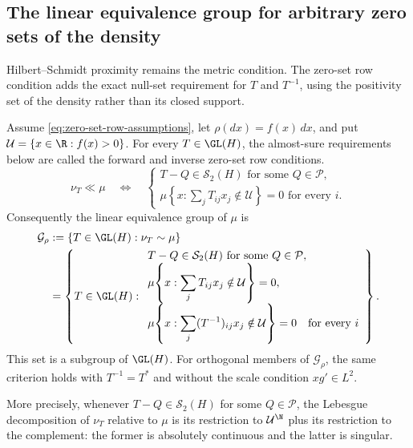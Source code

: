 \subsection{The linear equivalence group for arbitrary zero sets of the density}
\label{sec:linear-equivalence-group}

Hilbert--Schmidt proximity remains the metric condition.  The zero-set row
condition adds the exact null-set requirement for \(T\) and \(T^{-1}\), using
the positivity set of the density rather than its closed support.

\begin{theorem}
\label{thm:linear-equivalence-group}
Assume \eqref{eq:zero-set-row-assumptions}, let $\rho(dx)=f(x)\,dx$, and put
$\mathcal U=\{x\in\R:f(x)>0\}$.  For every $T\in\GL(H)$,
the almost-sure requirements below are called the forward and inverse
zero-set row conditions.
\begin{equation}
 \nu_T\ll\mu
 \quad\Longleftrightarrow\quad
 \begin{cases}
 T-Q\in\mathcal S_2(H)\text{ for some }Q\in\mathcal P,\\
 \displaystyle
 \mu\!\left\{x:\sum_jT_{ij}x_j\notin\mathcal U\right\}=0
       \text{ for every }i.
 \end{cases}
 \label{eq:absolute-continuity-operator-criterion}
\end{equation}
Consequently the linear equivalence group of $\mu$ is
\begin{equation}
 \begin{aligned}
 \mathcal G_\rho
 &:=\{T\in\GL(H):\nu_T\sim\mu\}\\
 &=\left\{T\in\GL(H):
 \begin{array}{l}
 T-Q\in\mathcal S_2(H)\text{ for some }Q\in\mathcal P,\\
 \displaystyle\mu\!\left\{x:\sum_jT_{ij}x_j\notin\mathcal U\right\}=0,\\
 \displaystyle\mu\!\left\{x:\sum_j(T^{-1})_{ij}x_j\notin\mathcal U\right\}=0
       \quad\text{for every }i
 \end{array}\right\}.
 \end{aligned}
 \label{eq:linear-equivalence-group}
\end{equation}
This set is a subgroup of $\GL(H)$.  For orthogonal members of
$\mathcal G_\rho$, the same criterion holds with $T^{-1}=T^*$
and without the scale condition $xg'\in L^2$.

More precisely, whenever $T-Q\in\mathcal S_2(H)$ for some
$Q\in\mathcal P$, the Lebesgue decomposition of $\nu_T$ relative to
$\mu$ is its restriction to $\mathcal U^{\N}$ plus its restriction
to the complement: the former is absolutely continuous and the latter
is singular.
\end{theorem}
